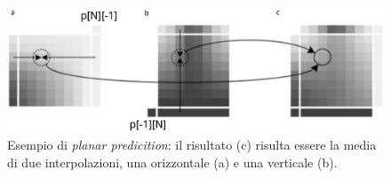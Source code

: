\begin{figure}[H]
  \centering
  \captionsetup{justification=raggedright}
  \includegraphics[scale=0.25]{Figures/Planar}
  \caption[Esempio di \emph{planar prediction}]
          {Esempio di \emph{planar predicition}: il risultato (c) risulta essere
           la media di due interpolazioni, una orizzontale (a) e una verticale 
           (b).}
\end{figure}
 


